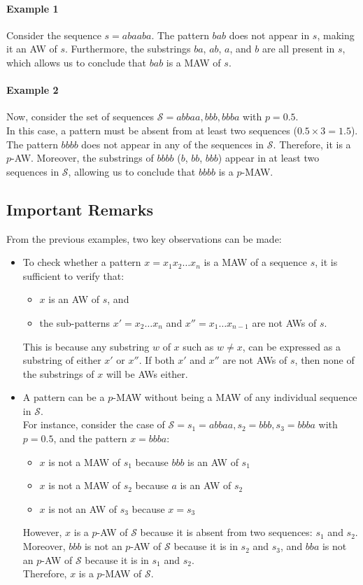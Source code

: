 \documentclass[conference]{IEEEtran}
\begin{document}
\paragraph{Example 1}
Consider the sequence $s = abaaba$. The pattern $bab$ does not appear in $s$, making it an AW of $s$. Furthermore, the substrings $ba$, $ab$, $a$, and $b$ are all present in $s$, which allows us to conclude that $bab$ is a MAW of $s$.
\paragraph{Example 2}
Now, consider the set of sequences $\mathcal S = {abbaa, bbb, bbba}$ with $p = 0.5$.\\
In this case, a pattern must be absent from at least two sequences ($0.5 \times 3 = 1.5$).\\
The pattern $bbbb$ does not appear in any of the sequences in $\mathcal S$. Therefore, it is a $p$-AW. Moreover, the substrings of $bbbb$ ($b$, $bb$, $bbb$) appear in at least two sequences in $\mathcal S$, allowing us to conclude that $bbbb$ is a $p$-MAW.
\subsection{Important Remarks}
From the previous examples, two key observations can be made:
\begin{itemize}
\item To check whether a pattern $x = x_1x_2\ldots x_n$ is a MAW of a sequence $s$, it is sufficient to verify that:
\begin{itemize}
\item $x$ is an AW of $s$, and
\item the sub-patterns $x'=x_2\ldots x_n$ and $x'' = x_1\ldots x_{n-1}$ are not AWs of $s$.
\end{itemize}
This is because any substring $w$ of $x$ such as $w\neq x$, can be expressed as a substring of either $x'$ or $x''$. If both $x'$ and $x''$ are not AWs of $s$, then none of the substrings of $x$ will be AWs either.
\item A pattern can be a $p$-MAW without being a MAW of any individual sequence in $\mathcal S$.\\
For instance, consider the case of $\mathcal S = {s_1=abbaa, s_2=bbb, s_3=bbba}$ with $p = 0.5$, and the pattern $x = bbba$:
\begin{itemize}
\item $x$ is not a MAW of $s_1$ because $bbb$ is an AW of $s_1$
\item $x$ is not a MAW of $s_2$ because $a$ is an AW of $s_2$
\item $x$ is not an AW of $s_3$ because $x = s_3$
\end{itemize}
However, $x$ is a $p$-AW of $\mathcal S$ because it is absent from two sequences: $s_1$ and $s_2$.
Moreover, $bbb$ is not an $p$-AW of $\mathcal S$ because it is in $s_2$ and $s_3$, and $bba$ is not an $p$-AW of $\mathcal S$ because it is in $s_1$ and $s_2$.\\
Therefore, $x$ is a $p$-MAW of $\mathcal S$.
\end{itemize}
\end{document}
